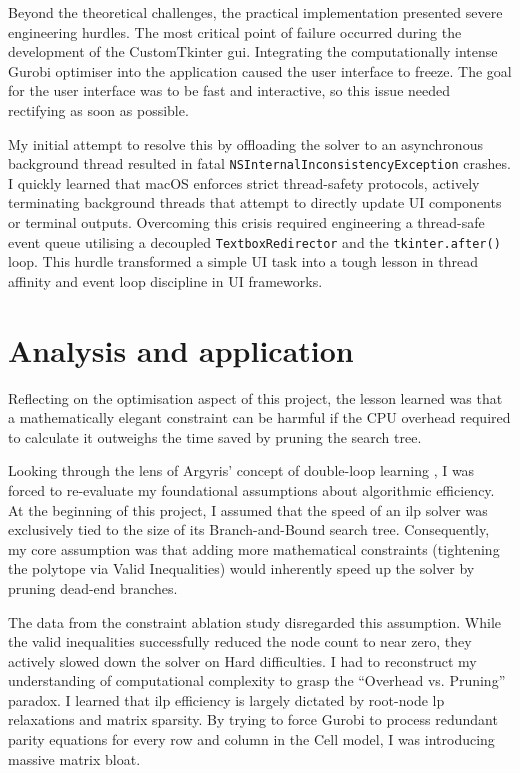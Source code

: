 Beyond the theoretical challenges, the practical implementation presented severe engineering hurdles. The most critical point of failure occurred during the development of the CustomTkinter \gls{gui}. Integrating the computationally intense Gurobi optimiser into the application caused the user interface to freeze. The goal for the user interface was to be fast and interactive, so this issue needed rectifying as soon as possible.

My initial attempt to resolve this by offloading the solver to an asynchronous background thread resulted in fatal \verb|NSInternalInconsistencyException| crashes. I quickly learned that macOS enforces strict thread-safety protocols, actively terminating background threads that attempt to directly update UI components or terminal outputs. Overcoming this crisis required engineering a thread-safe event queue utilising a decoupled \verb|TextboxRedirector| and the \verb|tkinter.after()| loop. This hurdle transformed a simple UI task into a tough lesson in thread affinity and event loop discipline in UI frameworks.

\section{Analysis and application}\label{sec:reflection}

Reflecting on the optimisation aspect of this project, the lesson learned was that a mathematically elegant constraint can be harmful if the CPU overhead required to calculate it outweighs the time saved by pruning the search tree.

Looking through the lens of Argyris' concept of double-loop learning \citep{argyris1977double}, I was forced to re-evaluate my foundational assumptions about algorithmic efficiency. At the beginning of this project, I assumed that the speed of an \gls{ilp} solver was exclusively tied to the size of its Branch-and-Bound search tree. Consequently, my core assumption was that adding more mathematical constraints (tightening the polytope via Valid Inequalities) would inherently speed up the solver by pruning dead-end branches.

The data from the constraint ablation study disregarded this assumption. While the valid inequalities successfully reduced the node count to near zero, they actively slowed down the solver on Hard difficulties. I had to reconstruct my understanding of computational complexity to grasp the ``Overhead vs. Pruning'' paradox. I learned that \gls{ilp} efficiency is largely dictated by root-node \gls{lp} relaxations and matrix sparsity. By trying to force Gurobi to process redundant parity equations for every row and column in the Cell model, I was introducing massive matrix bloat.

